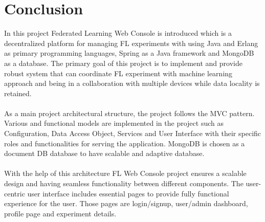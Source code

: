 \chapter{Conclusion}

In this project Federated Learning Web Console is introduced which is a decentralized platform for managing FL experiments with using Java and Erlang 
as primary programming languages, Spring as a Java framework and MongoDB as a database. The primary goal of this project is to implement and provide 
robust system that can coordinate FL experiment with machine learning approach and being in a collaboration with multiple devices while data locality
 is retained. \\
 \\
As a main project architectural structure, the project follows the MVC pattern. Various and functional models are implemented in the project such as 
Configuration, Data Access Object, Services and User Interface with their specific roles and functionalities for serving the application. MongoDB is 
chosen as a document DB database to have scalable and adaptive database. \\
\\
With the help of this architecture FL Web Console project ensures a scalable design and having seamless functionality between different components. 
The user-centric user interface includes essential pages to provide fully functional experience for the user. Those pages are login/signup, user/admin 
dashboard, profile page and experiment details.  
